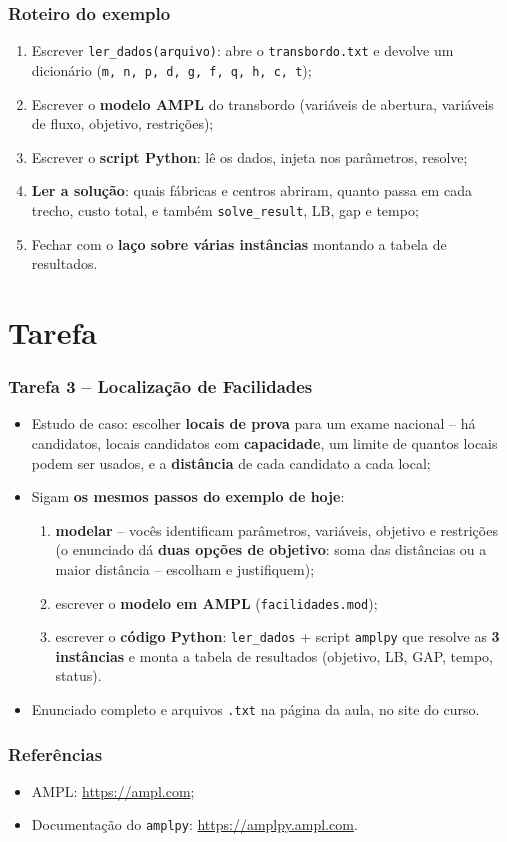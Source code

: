 \documentclass[fleqn]{beamer}
\begin{document}
\begin{frame}
	\frametitle{Roteiro do exemplo}
	\begin{enumerate}
		\item Escrever \texttt{ler\_dados(arquivo)}: abre o
			\texttt{transbordo.txt} e devolve um dicionário
			(\texttt{m, n, p, d, g, f, q, h, c, t});
		\item Escrever o \textbf{modelo AMPL} do transbordo (variáveis de
			abertura, variáveis de fluxo, objetivo, restrições);
		\item Escrever o \textbf{script Python}: lê os dados, injeta nos
			parâmetros, resolve;
		\item \textbf{Ler a solução}: quais fábricas e centros abriram,
			quanto passa em cada trecho, custo total, e também
			\texttt{solve\_result}, LB, gap e tempo;
		\item Fechar com o \textbf{laço sobre várias instâncias}
			montando a tabela de resultados.
	\end{enumerate}
\end{frame}

\section{Tarefa}

\begin{frame}
	\frametitle{Tarefa 3 -- Localização de Facilidades}
	\begin{itemize}
		\item Estudo de caso: escolher \textbf{locais de prova} para um
			exame nacional -- há candidatos, locais candidatos com
			\textbf{capacidade}, um limite de quantos locais podem ser
			usados, e a \textbf{distância} de cada candidato a cada local;
		\item Sigam \textbf{os mesmos passos do exemplo de hoje}:
		\begin{enumerate}
			\item \textbf{modelar} -- vocês identificam parâmetros,
				variáveis, objetivo e restrições (o enunciado dá
				\textbf{duas opções de objetivo}: soma das distâncias ou
				a maior distância -- escolham e justifiquem);
			\item escrever o \textbf{modelo em AMPL}
				(\texttt{facilidades.mod});
			\item escrever o \textbf{código Python}: \texttt{ler\_dados}
				+ script \texttt{amplpy} que resolve as \textbf{3
				instâncias} e monta a tabela de resultados (objetivo, LB,
				GAP, tempo, status).
		\end{enumerate}
		\item Enunciado completo e arquivos \texttt{.txt} na página da
			aula, no site do curso.
	\end{itemize}
\end{frame}

\begin{frame}
	\frametitle{Referências}
	\begin{itemize}
		\item AMPL: \url{https://ampl.com};
		\item Documentação do \texttt{amplpy}: \url{https://amplpy.ampl.com}.
	\end{itemize}
\end{frame}
\end{document}
